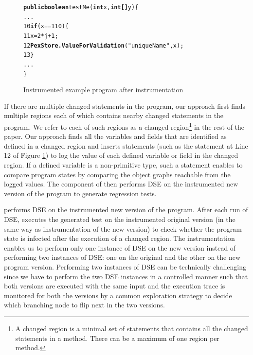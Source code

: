 \begin{figure}[t]
\begin{tiny}
\begin{alltt}
  \hspace{0.5cm}\textbf{public boolean} testMe(\textbf{int }x, \textbf{int[] } y)\{
  \hspace{1.0cm} ...
10\hspace{1.0cm} \textbf{if}(x == 110)\{	 
11\hspace{1.5cm} x = 2*j+1;
12\hspace{1.5cm} \textbf{PexStore.ValueForValidation}("uniqueName", x);
13\hspace{1.0cm} \} 
  \hspace{1.0cm} ...
  \}
\end{alltt}
\end{tiny}
\vspace{-0.2 in}
\caption{\scriptsize{Instrumented example program after instrumentation}}
\label{fig:Changed}
\vspace{-0.25 in}
\end{figure}

If there are multiple changed statements in the program, our approach first finds multiple regions each of which contains nearby changed statements in the program. We refer to each of such regions as a changed region\footnote{\scriptsize{A changed region is a minimal set of statements that contains all the changed statements in a method. There can be a maximum of one region per method.}} in the rest of the paper. Our approach finds all the variables and fields that are identified as defined in a changed region and inserts statements (such as the statement at Line 12 of Figure \ref{fig:Changed}) to log the value of each defined variable or field in the changed region. If a defined variable is a non-primitive type, such a statement enables to compare program states by comparing the object graphs reachable from the logged values. The  component of  then performs DSE on the instrumented new version of the program to generate regression tests. 

 performs DSE on the instrumented new version of the program. After each run of DSE,  executes the generated test on the instrumented original version (in the same way as instrumentation of the new version) to check whether the program state is infected after the execution of a changed region. The instrumentation enables us to perform only one instance of DSE on the new version instead of performing two instances of DSE: one on the original and the other on the new program version. Performing two instances of DSE can be technically challenging since we have to perform the two DSE instances in a controlled manner such that both versions are executed  with the same input and the execution trace is monitored for both the versions by a common exploration strategy to decide which branching node to flip next in the two versions. 


